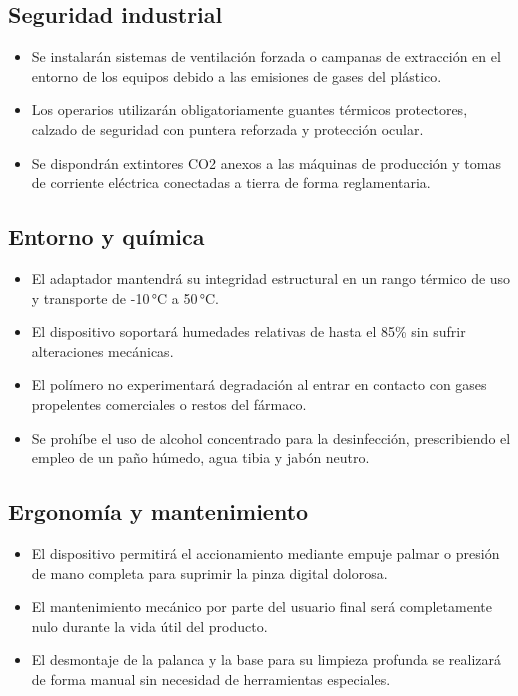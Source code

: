 \documentclass[11pt,a4paper]{article}
\begin{document}
\subsection{Seguridad industrial}
\begin{itemize}
    \item Se instalarán sistemas de ventilación forzada o campanas de extracción en el entorno de los equipos debido a las emisiones de gases del plástico.
    \item Los operarios utilizarán obligatoriamente guantes térmicos protectores, calzado de seguridad con puntera reforzada y protección ocular.
    \item Se dispondrán extintores CO2 anexos a las máquinas de producción y tomas de corriente eléctrica conectadas a tierra de forma reglamentaria.
\end{itemize}

\subsection{Entorno y química}
\begin{itemize}
    \item El adaptador mantendrá su integridad estructural en un rango térmico de uso y transporte de -10\,°C a 50\,°C.
    \item El dispositivo soportará humedades relativas de hasta el 85\% sin sufrir alteraciones mecánicas.
    \item El polímero no experimentará degradación al entrar en contacto con gases propelentes comerciales o restos del fármaco.
    \item Se prohíbe el uso de alcohol concentrado para la desinfección, prescribiendo el empleo de un paño húmedo, agua tibia y jabón neutro.
\end{itemize}

\subsection{Ergonomía y mantenimiento}
\begin{itemize}
    \item El dispositivo permitirá el accionamiento mediante empuje palmar o presión de mano completa para suprimir la pinza digital dolorosa.
    \item El mantenimiento mecánico por parte del usuario final será completamente nulo durante la vida útil del producto.
    \item El desmontaje de la palanca y la base para su limpieza profunda se realizará de forma manual sin necesidad de herramientas especiales.
\end{itemize}
\end{document}
